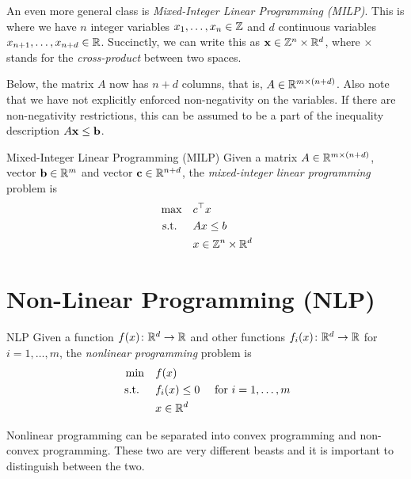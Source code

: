 An even more general class is \emph{Mixed-Integer Linear Programming (MILP)}.  This is where we have $n$ integer variables $x_1, \dots, x_n \in \mathbb{Z}$ and $d$ continuous variables $x_{n+1}, \dots, x_{n+d} \in \mathbb{R}$.  Succinctly, we can write this as $\mathbf{x} \in \mathbb{Z}^n \times \mathbb{R}^d$, where $\times$ stands for the \emph{cross-product} between two spaces.   

Below, the matrix $A$ now has $n+d$ columns, that is, $A \in \mathbb{R}^{m \times (n+d)}$.  Also note that we have not explicitly enforced non-negativity on the variables.  If there are non-negativity restrictions, this can be assumed to be a part of the inequality description $A\mathbf{x} \leq \mathbf{b}$.
\begin{general}{Mixed-Integer Linear Programming (MILP)}{\npcomplete}
Given a matrix $A \in \mathbb{R}^{m\times (n+d)}$, vector $\mathbf{b} \in \mathbb{R}^m$ and vector $\mathbf{c} \in \mathbb{R}^{n+d}$, the \emph{mixed-integer linear programming} problem is
\begin{equation}
\label{eq:MILP}
\begin{split}
\max \quad & c^\top x\\
\text{ s.t. }  \quad & Ax \leq b\\
& x \in \mathbb{Z}^n \times \mathbb{R}^d
\end{split}
\end{equation}
\end{general}

\section{Non-Linear Programming (NLP)}
\label{sec:intro-NLP}
\begin{general}{NLP}{\nphard}
Given a function $f(x)\colon \mathbb{R}^d \to \mathbb{R}$ and other functions $f_i(x)\colon \mathbb{R}^d \to \mathbb{R}$ for $i=1, \dots, m$,  the \emph{nonlinear programming} problem is
\begin{equation}
\label{eq:NLP}
\begin{split}
\min \quad & f(x)\\
\text{ s.t. }  \quad & f_i(x) \leq 0  \quad  \text{ for } i=1, \dots, m\\
& x \in \mathbb{R}^d
\end{split}
\end{equation}
\end{general}

Nonlinear programming can be separated into convex programming and non-convex programming.  These two are very different beasts and it is important to distinguish between the two.
